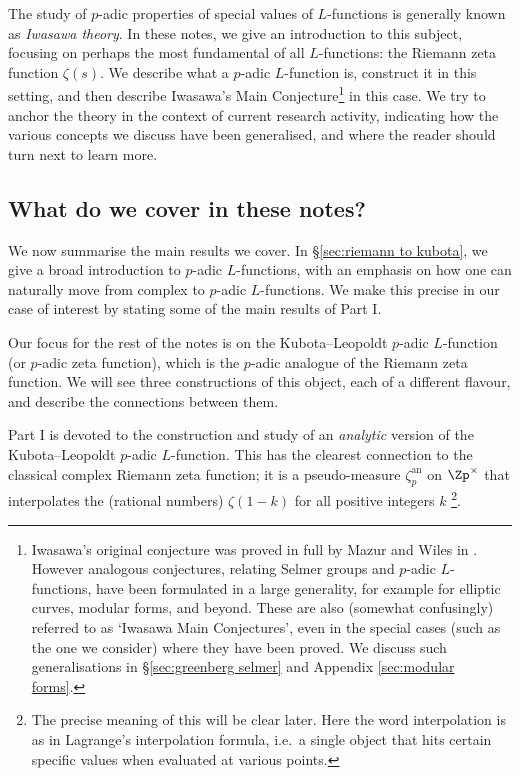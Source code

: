 \documentclass[a4paper,10pt, english, reqno]{smfart}
\numberwithin{equation}{section}
\begin{document}
The study of $p$-adic properties of special values of $L$-functions is generally known as \emph{Iwasawa theory}. In these notes, we give an introduction to this subject, focusing on perhaps the most fundamental of all $L$-functions: the Riemann zeta function $\zeta(s)$. We describe what a $p$-adic $L$-function is, construct it in this setting, and then describe Iwasawa's Main Conjecture\footnote{Iwasawa's original conjecture  was proved in full by Mazur and Wiles in \cite{MW84}. However analogous conjectures, relating Selmer groups and $p$-adic $L$-functions, have been formulated in a large generality, for example for elliptic curves, modular forms, and beyond. These are also (somewhat confusingly) referred to as `Iwasawa Main Conjectures', even in the special cases (such as the one we consider) where they have been proved. We discuss such generalisations in \S\ref{sec:greenberg selmer} and Appendix \ref{sec:modular forms}.} in this case. We try to anchor the theory in the context of current research activity, indicating how the various concepts we discuss have been generalised, and where the reader should turn next to learn more.




\subsection{What do we cover in these notes?} We now summarise the main results we cover. In \S \ref{sec:riemann to kubota}, we give a broad introduction to $p$-adic $L$-functions, with an emphasis on how one can naturally move from complex to $p$-adic $L$-functions. We make this precise in our case of interest by stating some of the main results of Part I. 

Our focus for the rest of the notes is on the Kubota--Leopoldt $p$-adic $L$-function (or $p$-adic zeta function), which is the $p$-adic analogue of the Riemann zeta function. We will see three constructions of this object, each of a different flavour, and describe the connections between them.

Part I is devoted to the construction and study of an \emph{analytic} version of the Kubota--Leopoldt $p$-adic $L$-function. This has the clearest connection to the classical complex Riemann zeta function; it is a pseudo-measure $\zeta_p^{\mathrm{an}}$ on $\Zp^\times$ that interpolates the (rational numbers) $\zeta(1-k)$ for all positive integers $k$ \footnote{ The precise meaning of this will be clear later. Here the word interpolation is as in Lagrange's interpolation formula, i.e.\ a single object that hits certain specific values when evaluated at various points.}.
\end{document}
